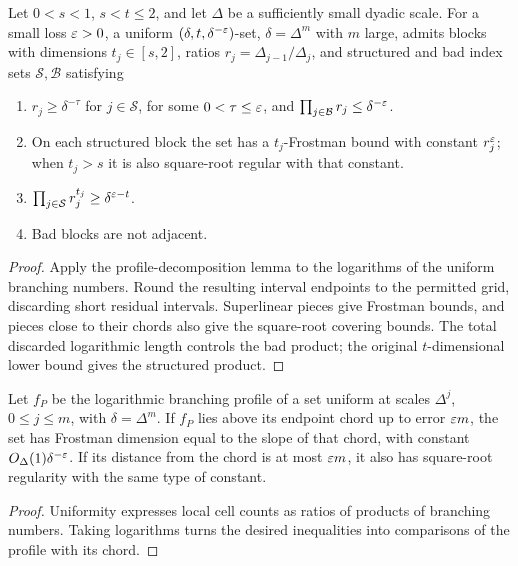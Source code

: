 \begin{proposition}
\label{prop:os-multiscale}
Let $0<s<1$, $s<t\leq2$, and let $\Delta$ be a sufficiently
small dyadic scale. For a small loss $\varepsilon>0$, a uniform
$(\delta,t,\delta^{-\varepsilon})$-set, $\delta=\Delta^m$ with $m$
large, admits blocks with dimensions $t_j\in[s,2]$, ratios
$r_j=\Delta_{j-1}/\Delta_j$, and structured and bad index sets
$\mathcal S,\mathcal B$ satisfying
\begin{enumerate}
\item $r_j\geq\delta^{-\tau}$ for $j\in\mathcal S$, for some
$0<\tau\leq\varepsilon$, and $\prod_{j\in\mathcal B}r_j\leq\delta^{-\varepsilon}$.
\item On each structured block the set has a $t_j$-Frostman bound
with constant $r_j^\varepsilon$; when $t_j>s$ it is also square-root
regular with that constant.
\item $\prod_{j\in\mathcal S}r_j^{t_j}\geq\delta^{\varepsilon-t}$.
\item Bad blocks are not adjacent.
\end{enumerate}
\end{proposition}
\begin{proof}
Apply the profile-decomposition lemma to the logarithms of the
uniform branching numbers. Round the resulting interval endpoints
to the permitted grid, discarding short residual intervals.
Superlinear pieces give Frostman bounds, and pieces close to their
chords also give the square-root covering bounds. The total discarded
logarithmic length controls the bad product; the original
$t$-dimensional lower bound gives the structured product.
\end{proof}

\begin{lemma}
\label{lem:profile-geometry}
Let $f_P$ be the logarithmic branching profile of a set uniform at
scales $\Delta^j$, $0\leq j\leq m$, with $\delta=\Delta^m$.
If $f_P$ lies above its endpoint chord up to error $\varepsilon m$,
the set has Frostman dimension equal to the slope of that chord,
with constant $O_\Delta(1)\delta^{-\varepsilon}$. If its distance from
the chord is at most $\varepsilon m$, it also has square-root regularity
with the same type of constant.
\end{lemma}
\begin{proof}
Uniformity expresses local cell counts as ratios of products of
branching numbers. Taking logarithms turns the desired inequalities
into comparisons of the profile with its chord.
\end{proof}

